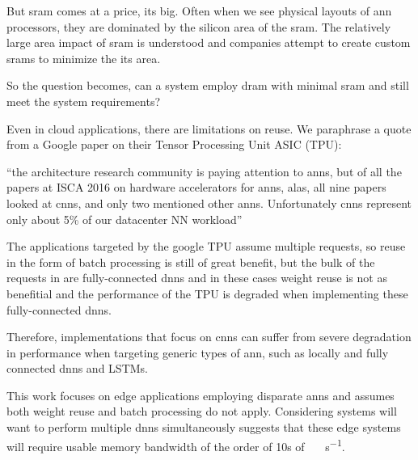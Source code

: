 But \ac{sram} comes at a price, its big. Often when we see physical layouts of \ac{ann} processors, they are dominated by the silicon area of the \ac{sram}. 
The relatively large area impact of \ac{sram} is understood and companies attempt to create custom \acp{sram} to minimize the its area.

So the question becomes, can a system employ \ac{dram} with minimal \ac{sram} and still meet the system requirements?

\iffalse
We believe a system can be designed with \ac{dram} as the primary processing store. This will require careful use of data structures to describe storage within \ac{dram} to ensure we make good use of the potential bandwidth. But there are other benefits we will take advantage of, but more about that later.
\fi

\iffalse
There important application is disparate \ac{ann}s because specifically a form of \ac{dnn}, Convolutional Neural networks (\ac{cnn}) have gotten good press recently, but they are not the only \ac{dnn}.
\fi

Even in cloud applications, there are limitations on reuse. We paraphrase a quote from a Google paper \cite{tensorflow2015-whitepaper} on their Tensor Processing Unit ASIC (TPU):

\hyphenquote{american}{the architecture research community is paying attention to \acp{ann}, but of all the papers at ISCA 2016 on hardware accelerators for \acp{ann}, alas, all nine papers looked at \ac{cnn}s, and only two mentioned other \acp{ann}. 
Unfortunately \ac{cnn}s represent only about 5\% of our datacenter NN workload}

The applications targeted by the google TPU \cite{tensorflow2015-whitepaper} assume multiple requests, so reuse in the form of batch processing is still of great benefit, but the bulk of the requests in \cite{tensorflow2015-whitepaper} are fully-connected \ac{dnn}s and in these cases weight reuse is not as benefitial and the performance of the TPU is degraded when implementing these fully-connected \ac{dnn}s.

Therefore, implementations that focus on \ac{cnn}s can suffer from severe degradation in performance when targeting generic types of \ac{ann}, such as locally and fully connected \ac{dnn}s and LSTMs.

This work focuses on edge applications employing disparate \ac{ann}s and assumes both weight reuse and batch processing do not apply.
Considering systems will want to perform multiple \ac{dnn}s simultaneously suggests that these edge systems will require usable memory bandwidth of the order of 10s of \SI[per-mode=symbol]{}{\tera \bit \per \second}.

